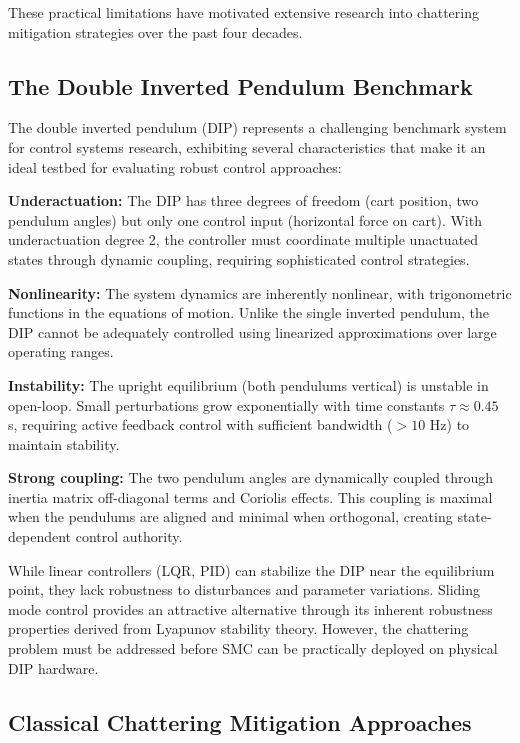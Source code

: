 \documentclass[12pt,a4paper,oneside]{report}
\begin{document}
These practical limitations have motivated extensive research into chattering mitigation strategies over the past four decades.

\subsection{The Double Inverted Pendulum Benchmark}

The double inverted pendulum (DIP) represents a challenging benchmark system for control systems research, exhibiting several characteristics that make it an ideal testbed for evaluating robust control approaches:

\textbf{Underactuation:} The DIP has three degrees of freedom (cart position, two pendulum angles) but only one control input (horizontal force on cart). With underactuation degree 2, the controller must coordinate multiple unactuated states through dynamic coupling, requiring sophisticated control strategies.

\textbf{Nonlinearity:} The system dynamics are inherently nonlinear, with trigonometric functions in the equations of motion. Unlike the single inverted pendulum, the DIP cannot be adequately controlled using linearized approximations over large operating ranges.

\textbf{Instability:} The upright equilibrium (both pendulums vertical) is unstable in open-loop. Small perturbations grow exponentially with time constants $\tau \approx 0.45$ s, requiring active feedback control with sufficient bandwidth ($> 10$ Hz) to maintain stability.

\textbf{Strong coupling:} The two pendulum angles are dynamically coupled through inertia matrix off-diagonal terms and Coriolis effects. This coupling is maximal when the pendulums are aligned and minimal when orthogonal, creating state-dependent control authority.

While linear controllers (LQR, PID) can stabilize the DIP near the equilibrium point, they lack robustness to disturbances and parameter variations. Sliding mode control provides an attractive alternative through its inherent robustness properties derived from Lyapunov stability theory. However, the chattering problem must be addressed before SMC can be practically deployed on physical DIP hardware.

\subsection{Classical Chattering Mitigation Approaches}
\end{document}
